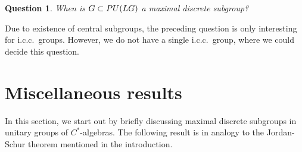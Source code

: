 \documentclass[11pt]{amsproc}
\theoremstyle{plain}
\newtheorem{question}[theorem]{Question}
\theoremstyle{remark}
\begin{document}
\begin{question}
When is $G \subset {\rm PU}(LG)$ a maximal discrete subgroup?
\end{question}

Due to existence of central subgroups, the preceding question is only interesting for i.c.c.\ groups. However, we do not have a single i.c.c.\ group, where we could decide this question.

\section{Miscellaneous results}

In this section, we start out by briefly discussing maximal discrete subgroups in unitary groups of $C^*$-algebras. The following result is in analogy to the Jordan-Schur theorem mentioned in the introduction.
\end{document}
